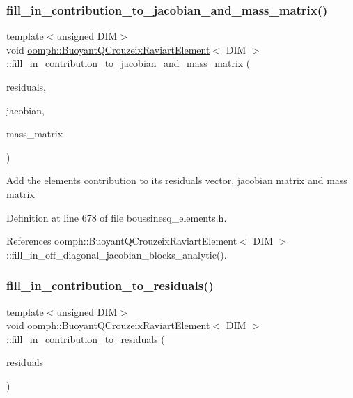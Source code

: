 \subsubsection{\texorpdfstring{fill\+\_\+in\+\_\+contribution\+\_\+to\+\_\+jacobian\+\_\+and\+\_\+mass\+\_\+matrix()}{fill\_in\_contribution\_to\_jacobian\_and\_mass\_matrix()}\hspace{0.1cm}{\footnotesize\ttfamily [3/3]}}
{\footnotesize\ttfamily template$<$unsigned D\+IM$>$ \\
void \hyperlink{classoomph_1_1BuoyantQCrouzeixRaviartElement}{oomph\+::\+Buoyant\+Q\+Crouzeix\+Raviart\+Element}$<$ D\+IM $>$\+::fill\+\_\+in\+\_\+contribution\+\_\+to\+\_\+jacobian\+\_\+and\+\_\+mass\+\_\+matrix (\begin{DoxyParamCaption}\item[{Vector$<$ double $>$ \&}]{residuals,  }\item[{Dense\+Matrix$<$ double $>$ \&}]{jacobian,  }\item[{Dense\+Matrix$<$ double $>$ \&}]{mass\+\_\+matrix }\end{DoxyParamCaption})\hspace{0.3cm}{\ttfamily [inline]}}

Add the element\textquotesingle{}s contribution to its residuals vector, jacobian matrix and mass matrix 

Definition at line 678 of file boussinesq\+\_\+elements.\+h.



References oomph\+::\+Buoyant\+Q\+Crouzeix\+Raviart\+Element$<$ D\+I\+M $>$\+::fill\+\_\+in\+\_\+off\+\_\+diagonal\+\_\+jacobian\+\_\+blocks\+\_\+analytic().

\mbox{\label{classoomph_1_1BuoyantQCrouzeixRaviartElement_ab87ed100a54d40884a70a67fcc305ecf}} 
\subsubsection{\texorpdfstring{fill\+\_\+in\+\_\+contribution\+\_\+to\+\_\+residuals()}{fill\_in\_contribution\_to\_residuals()}}
{\footnotesize\ttfamily template$<$unsigned D\+IM$>$ \\
void \hyperlink{classoomph_1_1BuoyantQCrouzeixRaviartElement}{oomph\+::\+Buoyant\+Q\+Crouzeix\+Raviart\+Element}$<$ D\+IM $>$\+::fill\+\_\+in\+\_\+contribution\+\_\+to\+\_\+residuals (\begin{DoxyParamCaption}\item[{Vector$<$ double $>$ \&}]{residuals }\end{DoxyParamCaption})\hspace{0.3cm}{\ttfamily [inline]}}



